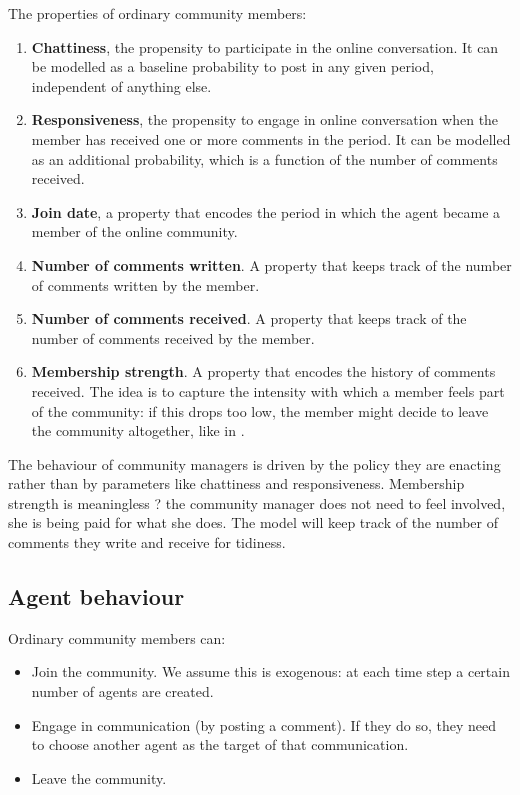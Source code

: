 \documentclass{article}
\begin{document}
The properties of ordinary community members:

\begin{enumerate}
\item \textbf{Chattiness}, the propensity to participate in the online conversation. It can be modelled as a baseline probability to post in any given period, independent of anything else. 
\item \textbf{Responsiveness}, the propensity to engage in online conversation when the member has received one or more comments in the period. It can be modelled as an additional probability, which is a function of the number of comments received. 
\item \textbf{Join date}, a property that encodes the period in which the agent became a member of the online community. 
\item \textbf{Number of comments written}. A property that keeps track of the number of comments written by the member. 
\item \textbf{Number of comments received}. A property that keeps track of the number of comments received by the member.
\item \textbf{Membership strength}. A property that encodes the history of comments received. The idea is to capture the intensity with which a member feels part of the community: if this drops too low, the member might decide to leave the community altogether, like in \cite{kim2015group}.  
\end{enumerate} 

The behaviour of community managers is driven by the policy they are enacting rather than by parameters like chattiness and responsiveness. Membership strength is meaningless ? the community manager does not need to feel involved, she is being paid for what she does. The model will keep track of the number of comments they write and receive for tidiness.

\subsection{Agent behaviour}

Ordinary community members can:

\begin{itemize}
\item Join the community. We assume this is exogenous: at each time step a certain number of agents are created.
\item Engage in communication (by posting a comment). If they do so, they need to choose another agent as the target of that communication. 
\item Leave the community.
\end{itemize}
\end{document}
